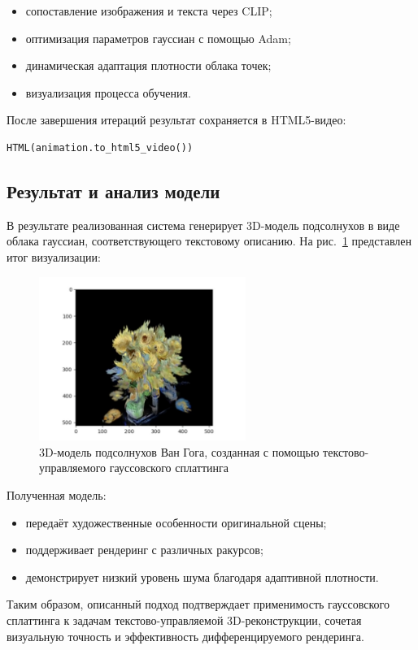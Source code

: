 \begin{itemize}
    \item сопоставление изображения и текста через CLIP;
    \item оптимизация параметров гауссиан с помощью Adam;
    \item динамическая адаптация плотности облака точек;
    \item визуализация процесса обучения.
\end{itemize}

После завершения итераций результат сохраняется в HTML5-видео:

\begin{lstlisting}[language=Python]
HTML(animation.to_html5_video())
\end{lstlisting}

\subsection{Результат и анализ модели}

В результате реализованная система генерирует 3D-модель подсолнухов в виде облака гауссиан, соответствующего текстовому описанию. На рис.~\ref{fig:sunflowers_3d} представлен итог визуализации:

\begin{figure}[h!]
    \centering
    \includegraphics[width=0.6\textwidth]{sunflowers_3d_model.png}
    \caption{3D-модель подсолнухов Ван Гога, созданная с помощью текстово-управляемого гауссовского сплаттинга}
    \label{fig:sunflowers_3d}
\end{figure}

Полученная модель:

\begin{itemize}
    \item передаёт художественные особенности оригинальной сцены;
    \item поддерживает рендеринг с различных ракурсов;
    \item демонстрирует низкий уровень шума благодаря адаптивной плотности.
\end{itemize}

Таким образом, описанный подход подтверждает применимость гауссовского сплаттинга к задачам текстово-управляемой 3D-реконструкции, сочетая визуальную точность и эффективность дифференцируемого рендеринга.

